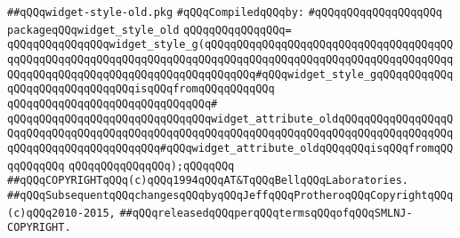 \label{src/lib/x-kit/widget/old/lib/widget-style-old.pkg}
\verb|##qQQqwidget-style-old.pkg|\newline
\newline
\verb|#qQQqCompiledqQQqby:|\newline
\verb|#qQQqqQQqqQQqqQQqqQQq|\newline
\newline
\newline
\verb|packageqQQqwidget_style_old|\newline
\verb|qQQqqQQqqQQqqQQq=|\newline
\verb|qQQqqQQqqQQqqQQqwidget_style_g(qQQqqQQqqQQqqQQqqQQqqQQqqQQqqQQqqQQqqQQqqQQqqQQqqQQqqQQqqQQqqQQqqQQqqQQqqQQqqQQqqQQqqQQqqQQqqQQqqQQqqQQqqQQqqQQqqQQqqQQqqQQqqQQqqQQqqQQqqQQqqQQqqQQq#qQQqwidget_style_gqQQqqQQqqQQqqQQqqQQqqQQqqQQqqQQqisqQQqfromqQQqqQQqqQQq|\newline
\verb|qQQqqQQqqQQqqQQqqQQqqQQqqQQqqQQq#|\newline
\verb|qQQqqQQqqQQqqQQqqQQqqQQqqQQqqQQqwidget_attribute_oldqQQqqQQqqQQqqQQqqQQqqQQqqQQqqQQqqQQqqQQqqQQqqQQqqQQqqQQqqQQqqQQqqQQqqQQqqQQqqQQqqQQqqQQqqQQqqQQqqQQqqQQqqQQqqQQq#qQQqwidget_attribute_oldqQQqqQQqisqQQqfromqQQqqQQqqQQq|\newline
\verb|qQQqqQQqqQQqqQQq);qQQqqQQq|\newline
\newline
\newline
\newline
\newline
\verb|##qQQqCOPYRIGHTqQQq(c)qQQq1994qQQqAT&TqQQqBellqQQqLaboratories.|\newline
\verb|##qQQqSubsequentqQQqchangesqQQqbyqQQqJeffqQQqProtheroqQQqCopyrightqQQq(c)qQQq2010-2015,|\newline
\verb|##qQQqreleasedqQQqperqQQqtermsqQQqofqQQqSMLNJ-COPYRIGHT.|\newline

